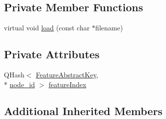 \subsection*{Private Member Functions}
\begin{DoxyCompactItemize}
\item 
virtual void \hyperlink{class_features_complex_network_a122860a57231cd14eca3add9c482290e}{load} (const char $\ast$filename)
\end{DoxyCompactItemize}
\subsection*{Private Attributes}
\begin{DoxyCompactItemize}
\item 
Q\+Hash$<$ \hyperlink{class_feature_abstract_key}{Feature\+Abstract\+Key}, \\*
\hyperlink{_complex_network_8hpp_a8323334ca788fde39682469321590d52}{node\+\_\+id} $>$ \hyperlink{class_features_complex_network_a0ae97c0bad2fcba543df55522c46242e}{feature\+Index}
\end{DoxyCompactItemize}
\subsection*{Additional Inherited Members}


